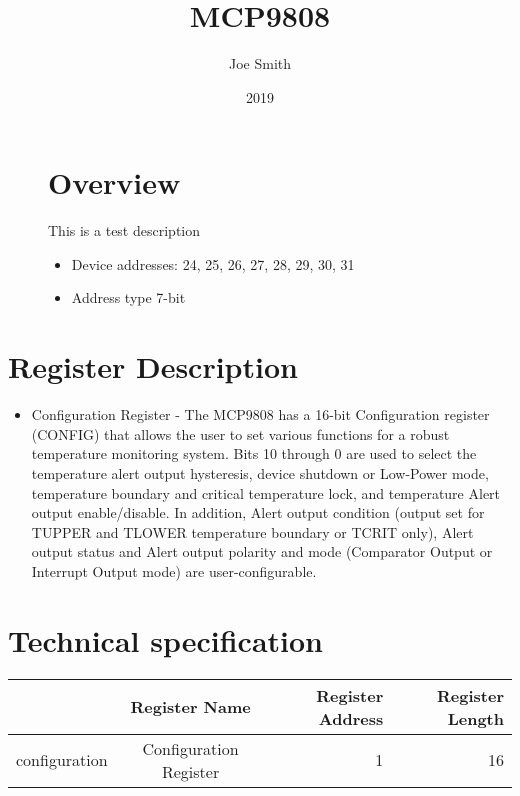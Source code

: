 \documentclass[a4paper,12pt,oneside,pdflatex,italian,final,twocolumn]{article}
\title{ MCP9808 }
\author{ Joe Smith }
\date{ 2019 }
\begin{document}
\pagestyle{fancy}



\onecolumn


\begin{figure}
\begin{minipage}{0.47\textwidth}

\section{Overview}
    This is a test description
    \begin{itemize}
        \item Device addresses:
          24,
          25,
          26,
          27,
          28,
          29,
          30,
          31
        \item Address type 7-bit
    \end{itemize}


\end{minipage}
\hfill

\end{figure}


\section{Register Description}
\begin{itemize}
\item Configuration Register - The MCP9808 has a 16-bit Configuration register (CONFIG) that
allows the user to set various functions for a robust temperature
monitoring system.
Bits 10 through 0 are used to select the temperature alert output
hysteresis, device shutdown or Low-Power mode, temperature boundary
and critical temperature lock, and temperature Alert output
enable/disable.
In addition, Alert output condition (output set for TUPPER and
TLOWER temperature boundary or TCRIT only), Alert output status
and Alert output polarity and mode (Comparator Output or Interrupt
Output mode) are user-configurable.

\end{itemize}

\section{Technical specification}
\centering
\begin{tabular}{lcrr}
\toprule
 & Register Name & Register Address & Register Length \\
\midrule
configuration & Configuration Register & 1 & 16 \\
\bottomrule
\end{tabular}
\end{document}
